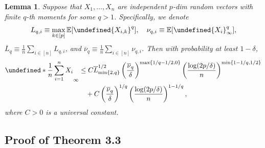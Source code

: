 \documentclass[10pt,a4paper]{amsart}
\theoremstyle{plain}
\newtheorem{lemma}{Lemma}[section]
\theoremstyle{remark}
\def\bar#1{\overline{#1}}
\let\abs\undefined %
\DeclarePairedDelimiter\abs{\lvert}{\rvert}
\let\norm\undefined %
\DeclarePairedDelimiter\norm{\lVert}{\rVert}
\newcommand{\Exp}{\mathbb{E}}	%
\begin{document}
\setcounter{lemma}{12}
\begin{lemma} \label{thm:conc_ineq_q}
    Suppose that $X_1, \dots, X_n$ are independent $p$-dim random vectors with finite $q$-th moments for some $q > 1$. Specifically, we denote
    \begin{equation*}
        L_{q,i} \equiv \max_{k \in [p]} \Exp[\abs{X_{i,k}}^q],
        \quad
        \nu_{q,i} \equiv \Exp[\norm{X_{i}}_\infty^q],
    \end{equation*}
    $\bar{L}_{q} \equiv \frac{1}{n} \sum_{i \in [n]} L_{q,i}$,
    and $\bar\nu_{q} \equiv \frac{1}{n} \sum_{i \in [n]} \nu_{q,i}$. Then with probability at least $1 - \delta$,
    \begin{equation*}
    \begin{aligned}
        \norm*{\frac{1}{n}\sum_{i=1}^n X_i}_\infty
        & \leq C \bar{L}_{\min\{2, q\}}^{1/2} \left(\frac{\bar{\nu}_q}{\delta} \right)^{\max\{1/q-1/2,0\}}
        \left(\frac{\log(2p/\delta)}{n}\right)^{\min\{1-1/q, 1/2\}} \\
        & \quad + C \left(\frac{\bar{\nu}_q}{\delta} \right)^{1/q} \left(\frac{\log(2p/\delta)}{n}\right)^{1-1/q},
    \end{aligned}
    \end{equation*}
    where $C > 0$ is a universal constant.
\end{lemma}

\setcounter{equation}{12}
\setcounter{subsection}{5}
\subsection{Proof of Theorem 3.3} \label{sec:pf_psg_error}
\end{document}
